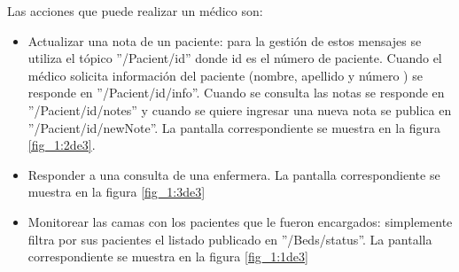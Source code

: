 Las acciones que puede realizar un médico son:
\begin{itemize}
\item Actualizar una nota de un paciente: para la gestión de estos mensajes se utiliza el tópico ''/Pacient/id'' donde id es el número de paciente. Cuando el médico solicita información del paciente (nombre, apellido y número ) se responde  en ''/Pacient/id/info''. Cuando se consulta las notas se responde en ''/Pacient/id/notes'' y cuando se quiere ingresar una nueva nota se publica en ''/Pacient/id/newNote''. La pantalla correspondiente se muestra en la figura \ref{fig_1:2de3}.
\item Responder a una consulta de una enfermera. La pantalla correspondiente se muestra en la figura \ref{fig_1:3de3}
\item Monitorear las camas con los pacientes que le fueron encargados: simplemente filtra por sus pacientes el listado publicado en ''/Beds/status''. La pantalla correspondiente se muestra en la figura \ref{fig_1:1de3}

\end{itemize}


